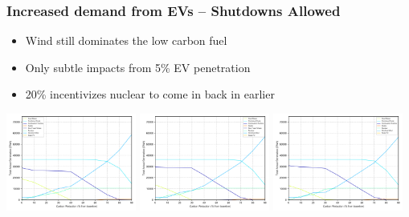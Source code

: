 \documentclass[xcolor=dvipsnames]{beamer}
\begin{document}
\begin{frame}  \frametitle{Increased demand from EVs -- Shutdowns Allowed}
\begin{itemize}
  \item Wind still dominates the low carbon fuel
  \item Only subtle impacts from 5\% EV penetration
  \item 20\% incentivizes nuclear to come in back in earlier
\end{itemize}
  \includegraphics[width=0.32\textwidth]{includes/no_leakage_shutdowns_agg_generation_cntlreg.png}
  \includegraphics[width=0.32\textwidth]{includes/no_leakage_shutdowns_5pct_EVs_agg_generation_cntlreg.png}  \includegraphics[width=0.32\textwidth]{includes/no_leakage_shutdowns_20pct_EVs_agg_generation_cntlreg.png}
  
  
  
%
%

\end{frame}


%
%
%
\end{document}
